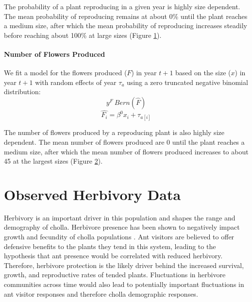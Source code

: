\documentclass[11pt]{article}
\begin{document}
	\begin{figure}
		\caption{}
		\label{app:repro}
	\end{figure}
	
	
	\begin{figure}
		\caption{ }
		\label{app:flow}
	\end{figure}
	
	The probability of a plant reproducing in a given year is highly size dependent. 
	The mean probability of reproducing remains at about 0\% until the plant reaches a medium size, after which the mean probability of reproducing increases steadily before reaching about 100\% at large sizes (Figure \ref{app:repro}). 
	
	\paragraph{Number of Flowers Produced}
	We fit a model for the flowers produced ($F$) in year $t+1$ based on the size ($x$) in year $t+1$ with random effects of year $\tau_a$ using a zero truncated negative binomial distribution: 
	$$y^{F}~ Bern(\hat{F})$$
	$$\hat{F_i} = \beta^0  x_i + \tau_{a[i]}$$
	
	The number of flowers produced by a reproducing plant is also highly size dependent. 
	The mean number of flowers produced are 0 until the plant reaches a medium size, after which the mean number of flowers produced increases to about 45 at the largest sizes (Figure \ref{app:flow}).
	
	
	
	
	
	
	
	\section{Observed Herbivory Data} \label{appendix:B}
	\renewcommand{\thefigure}{B\arabic{figure}}
	
	Herbivory is an important driver in this population and shapes the range and demography of cholla.
	Herbivore presence has been shown to negatively impact growth and fecundity of cholla populations \citep{Miller2009}.
	Ant visitors are believed to offer defensive benefits to the plants they tend in this system, leading to the hypothesis that ant presence would be correlated with reduced herbivory.
	Therefore, herbivore protection is the likely driver behind the increased survival, growth, and reproductive rates of tended plants. 
	Fluctuations in herbivore communities across time would also lead to potentially important fluctuations in ant visitor responses and therefore cholla demographic responses.
	
\end{document}
